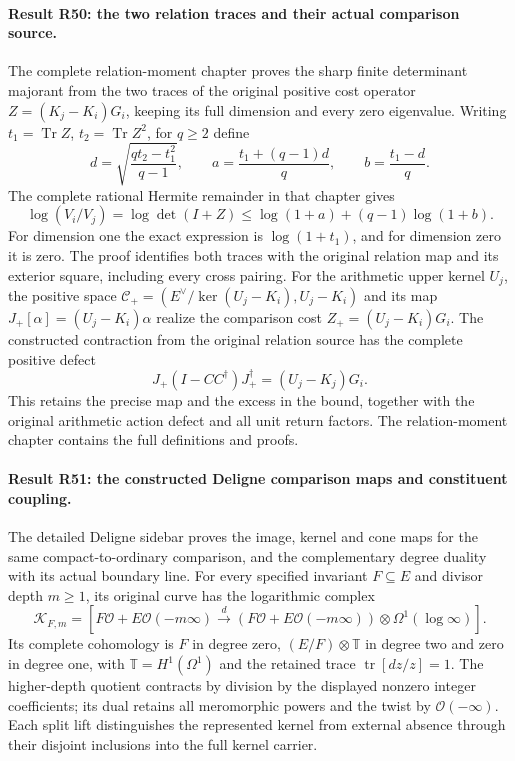\paragraph{Result R50: the two relation traces and their actual comparison source.}
The complete relation-moment chapter proves the sharp finite determinant
majorant from the two traces of the original positive cost operator
\(Z=(K_j-K_i)G_i\), keeping its full dimension and every zero eigenvalue.
Writing \(t_1=\operatorname{Tr}Z\), \(t_2=\operatorname{Tr}Z^2\), for
\(q\ge2\) define
\[
 d=\sqrt{\frac{qt_2-t_1^2}{q-1}},\qquad
 a=\frac{t_1+(q-1)d}{q},\qquad b=\frac{t_1-d}{q}.
\]
The complete rational Hermite remainder in that chapter gives
\[
 \log(V_i/V_j)=\log\det(I+Z)
 \le\log(1+a)+(q-1)\log(1+b).
\]
For dimension one the exact expression is \(\log(1+t_1)\), and for
dimension zero it is zero. The proof identifies both traces with
the original relation map and its exterior square, including every
cross pairing. For the arithmetic upper kernel \(U_j\), the positive
space \(\mathcal C_+=(E^\vee/\ker(U_j-K_i),U_j-K_i)\) and its map
\(J_+[\alpha]=(U_j-K_i)\alpha\) realize the comparison cost
\(Z_+=(U_j-K_i)G_i\). The constructed contraction from the original
relation source has the complete positive defect
\[
 J_+(I-CC^\dagger)J_+^\dagger=(U_j-K_j)G_i.
\]
This retains the precise map and the excess in the bound, together
with the original arithmetic action defect and all unit return factors.
The relation-moment chapter contains the full definitions and proofs.

\paragraph{Result R51: the constructed Deligne comparison maps and constituent coupling.}
The detailed Deligne sidebar proves the image, kernel and cone maps
for the same compact-to-ordinary comparison, and the complementary
degree duality with its actual boundary line. For every specified
invariant \(F\subseteq E\) and divisor depth \(m\ge1\), its original
curve has the logarithmic complex
\[
 \mathscr K_{F,m}=
 [F\mathcal O+E\mathcal O(-m\infty)
   \xrightarrow d(F\mathcal O+E\mathcal O(-m\infty))
                       \otimes\Omega^1(\log\infty)].
\]
Its complete cohomology is \(F\) in degree zero,
\((E/F)\otimes\mathbb T\) in degree two and zero in degree one,
with \(\mathbb T=H^1(\Omega^1)\) and the retained trace
\(\operatorname{tr}[dz/z]=1\). The higher-depth quotient contracts
by division by the displayed nonzero integer coefficients; its
dual retains all meromorphic powers and the twist by
\(\mathcal O(-\infty)\). Each split lift distinguishes the represented
kernel from external absence through their disjoint inclusions into
the full kernel carrier.

